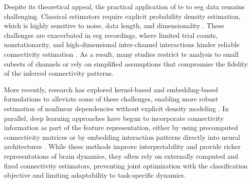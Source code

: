 Despite its theoretical appeal, the practical application of \gls{te} to \gls{eeg} data remains challenging. Classical estimators require explicit probability density estimation, which is highly sensitive to noise, data length, and dimensionality \cite{vicente2011transfer}. These challenges are exacerbated in \gls{eeg} recordings, where limited trial counts, nonstationarity, and high-dimensional inter-channel interactions hinder reliable connectivity estimation \cite{zhang2015bayesian,faes2017information}. As a result, many studies restrict \gls{te} analysis to small subsets of channels or rely on simplified assumptions that compromise the fidelity of the inferred connectivity patterns.

More recently, research has explored kernel-based and embedding-based formulations to alleviate some of these challenges, enabling more robust estimation of nonlinear dependencies without explicit density modeling \cite{marinazzo2011kernel}. In parallel, deep learning approaches have begun to incorporate connectivity information as part of the feature representation, either by using precomputed connectivity matrices or by embedding interaction patterns directly into neural architectures \cite{li2019deep,rolls2022effective}. While these methods improve interpretability and provide richer representations of brain dynamics, they often rely on externally computed and fixed connectivity estimators, preventing joint optimization with the classification objective and limiting adaptability to task-specific dynamics.

